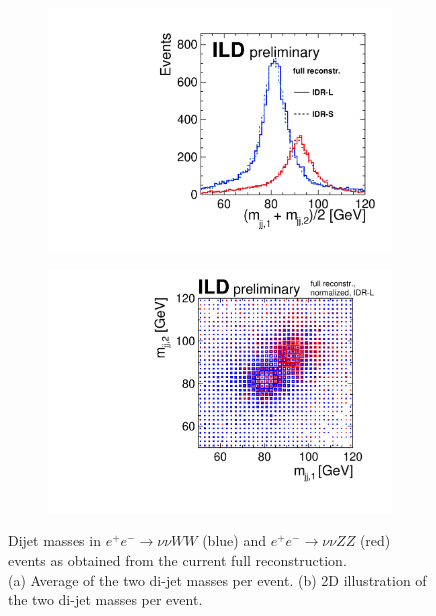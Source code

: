 \begin{figure}[htbp]
\begin{subfigure}{0.455\hsize} \includegraphics[width=\textwidth]{Performance/fig/ls_comp_rec_monly.pdf}
 \caption{ \label{fig:qgc:rec:1d}}
 \end{subfigure}
\begin{subfigure}{0.49\hsize} \includegraphics[width=\textwidth]{Performance/fig/m_m_rec.pdf}
 \caption{  \label{fig:qgc:rec:2d}}
 \end{subfigure}
\caption{Dijet masses in $e^+e^- \to \nu\nu WW$ (blue) and $e^+e^- \to \nu\nu ZZ$ (red) events as obtained from the current full reconstruction.\\
(a) Average of the two di-jet masses per event.
(b) 2D illustration of the two di-jet masses per event.
}
\label{fig:qgc:rec}
\end{figure}


